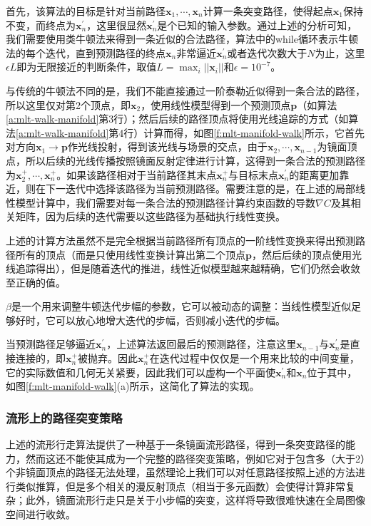 首先，该算法的目标是针对当前路径$\mathbf{x}_1,\cdots,\mathbf{x}_n$计算一条突变路径，使得起点$\mathbf{x}_1$保持不变，而终点为$\mathbf{x}^{'}_n$，这里很显然$\mathbf{x}^{'}_n$是个已知的输入参数。通过上述的分析可知，我们需要使用类牛顿法来得到一条近似的合法路径，算法中的while循环表示牛顿法的每个迭代，直到预测路径的终点$\mathbf{x}_n$非常逼近$\mathbf{x}^{'}_n$或者迭代次数大于$N$为止，这里$\epsilon L$即为无限接近的判断条件，取值$L=\max_i||\mathbf{x}_i||$和$\epsilon=10^{-7}$。

与传统的牛顿法不同的是，我们不能直接通过一阶泰勒近似得到一条合法的路径，所以这里仅对第2个顶点，即$\mathbf{x}_2$，使用线性模型得到一个预测顶点$\mathbf{p}$（如算法\ref{a:mlt-walk-manifold}第3行）；然后后续的路径顶点将使用光线追踪的方式（如算法\ref{a:mlt-walk-manifold}第4行）计算而得，如图\ref{f:mlt-manifold-walk}所示，它首先对方向$\mathbf{x}_1\to\mathbf{p}$作光线投射，得到该光线与场景的交点，由于$\mathbf{x}_2,\cdots,\mathbf{x}_{n-1}$为镜面顶点，所以后续的光线传播按照镜面反射定律进行计算，这得到一条合法的预测路径为$\mathbf{x}^{+}_2,\cdots,\mathbf{x}^{+}_n$。如果该路径相对于当前路径其末点$\mathbf{x}^{+}_n$与目标末点$\mathbf{x}^{'}_n$的距离更加靠近，则在下一迭代中选择该路径为当前预测路径。需要注意的是，在上述的局部线性模型计算中，我们需要对每一条合法的预测路径计算约束函数的导数$\nabla C$及其相关矩阵，因为后续的迭代需要以这些路径为基础执行线性变换。

上述的计算方法虽然不是完全根据当前路径所有顶点的一阶线性变换来得出预测路径所有的顶点（而是只使用线性变换计算出第二个顶点$\mathbf{p}$，然后后续的顶点使用光线追踪得出），但是随着迭代的推进，线性近似模型越来越精确，它们仍然会收敛至正确的值。

$\beta$是一个用来调整牛顿迭代步幅的参数，它可以被动态的调整：当线性模型近似足够好时，它可以放心地增大迭代的步幅，否则减小迭代的步幅。

当预测路径足够逼近$\mathbf{x}^{'}_n$，上述算法返回最后的预测路径，注意这里$\mathbf{x}_{n-1}$与$\mathbf{x}^{'}_n$是直接连接的，即$\mathbf{x}^{+}_n$被抛弃。因此$\mathbf{x}^{+}_n$在迭代过程中仅仅是一个用来比较的中间变量，它的实际数值和几何无关紧要，因此我们可以虚构一个平面使$\mathbf{x}^{'}_n$和$\mathbf{x}_n$位于其中，如图\ref{f:mlt-manifold-walk}(a)所示，这简化了算法的实现。





\subsubsection{流形上的路径突变策略}\label{sec:mlt-manifold-perturbation}
上述的流形行走算法提供了一种基于一条镜面流形路径，得到一条突变路径的能力，然而这还不能使其成为一个完整的路径突变策略，例如它对于包含多（大于2）个非镜面顶点的路径无法处理，虽然理论上我们可以对任意路径按照上述的方法进行类似推算，但是多个相关的漫反射顶点（相当于多元函数）会使得计算非常复杂；此外，镜面流形行走只是关于小步幅的突变，这样将导致很难快速在全局图像空间进行收敛。

